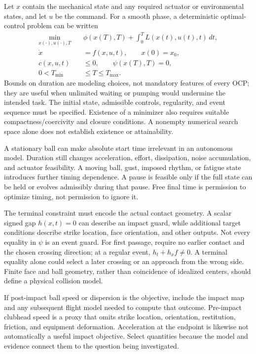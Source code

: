 \documentclass[12pt, openany]{book}
\theoremstyle{plain}
\begin{document}
Let $x$ contain the mechanical state and any required actuator or environmental
states, and let $u$ be the command. For a smooth phase, a deterministic
optimal-control problem can be written
\begin{equation}\label{eq:ocp_cost}
\begin{aligned}
 \min_{x(\cdot),u(\cdot),T}\quad &
 \phi(x(T),T)+\int_0^T L(x(t),u(t),t)\,dt,\\
 \dot x&=f(x,u,t),\qquad x(0)=x_0,\\
 c(x,u,t)&\leq0,\qquad \psi(x(T),T)=0,\\
 0<T_{\min}&\leq T\leq T_{\max}.
\end{aligned}
\end{equation}
Bounds on duration are modeling choices, not mandatory features of every
OCP; they are useful when unlimited waiting or pumping would undermine the
intended task. The initial state, admissible controls, regularity, and event
sequence must be specified. Existence of a minimizer also requires suitable
compactness/coercivity and closure conditions. A nonempty numerical search
space alone does not establish existence or attainability.

A stationary ball can make absolute start time irrelevant in an autonomous
model. Duration still changes acceleration, effort, dissipation, noise
accumulation, and actuator feasibility. A moving ball, gust, imposed rhythm,
or fatigue state introduces further timing dependence. A pause is feasible
only if the full state can be held or evolves admissibly during that pause.
Free final time is permission to optimize timing, not permission to ignore it.

The terminal constraint must encode the actual contact geometry. A scalar
signed gap $h(x,t)=0$ can describe an impact guard, while additional target
conditions describe strike location, face orientation, and other outputs.
Not every equality in $\psi$ is an event guard. For first passage, require
no earlier contact and the chosen crossing direction; at a regular event,
$h_t+h_xf\ne0$. A terminal equality alone could select a later crossing or
an approach from the wrong side. Finite face and ball geometry, rather than
coincidence of idealized centers, should define a physical collision model.

If post-impact ball speed or dispersion is the objective, include the impact
map and any subsequent flight model needed to compute that outcome. Pre-impact
clubhead speed is a proxy that omits strike location, orientation, restitution,
friction, and equipment deformation. Acceleration at the endpoint is likewise
not automatically a useful impact objective. Select quantities because the
model and evidence connect them to the question being investigated.
\end{document}
